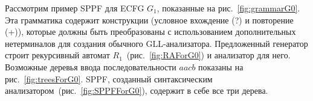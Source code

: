 


Рассмотрим пример SPPF для ECFG $ G_1 $, показанные на рис.~\ref{fig:grammarG0}.
Эта грамматика содержит конструкции (условное вхождение (?) и повторение (+)),
которые должны быть преобразованы с использованием дополнительных нетерминалов 
для создания обычного GLL-анализатора.
Предложенный генератор строит рекурсивный автомат $ R_1 $~(рис.~\ref{fig:RAForG0})
и анализатор для него. Возможные деревья ввода последовательности $ aacb $ показаны 
на рис.~\ref{fig:treesForG0}. SPPF, созданный синтаксическим анализатором~(рис.~\ref{fig:SPPFForG0}),
содержит в себе все три дерева.

\begin{figure}[ht]   
	\centering
	~
	\subfloat[SPPF]{
}
\end{figure}
